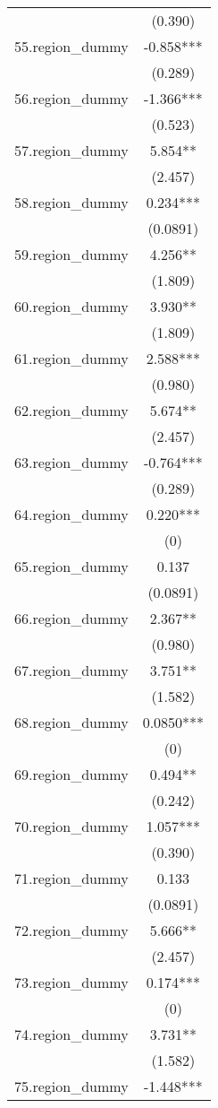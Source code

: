\documentclass[]{article}
\begin{document}
\begin{tabular}{lc}
 & (0.390) \\
55.region\_dummy & -0.858*** \\
 & (0.289) \\
56.region\_dummy & -1.366*** \\
 & (0.523) \\
57.region\_dummy & 5.854** \\
 & (2.457) \\
58.region\_dummy & 0.234*** \\
 & (0.0891) \\
59.region\_dummy & 4.256** \\
 & (1.809) \\
60.region\_dummy & 3.930** \\
 & (1.809) \\
61.region\_dummy & 2.588*** \\
 & (0.980) \\
62.region\_dummy & 5.674** \\
 & (2.457) \\
63.region\_dummy & -0.764*** \\
 & (0.289) \\
64.region\_dummy & 0.220*** \\
 & (0) \\
65.region\_dummy & 0.137 \\
 & (0.0891) \\
66.region\_dummy & 2.367** \\
 & (0.980) \\
67.region\_dummy & 3.751** \\
 & (1.582) \\
68.region\_dummy & 0.0850*** \\
 & (0) \\
69.region\_dummy & 0.494** \\
 & (0.242) \\
70.region\_dummy & 1.057*** \\
 & (0.390) \\
71.region\_dummy & 0.133 \\
 & (0.0891) \\
72.region\_dummy & 5.666** \\
 & (2.457) \\
73.region\_dummy & 0.174*** \\
 & (0) \\
74.region\_dummy & 3.731** \\
 & (1.582) \\
75.region\_dummy & -1.448*** \\

\end{tabular}
\end{document}
